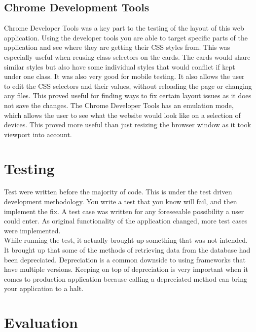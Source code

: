 \subsection{Chrome Development Tools}
Chrome Developer Tools \citep{cdt:2014} was a key part to the testing of the layout of this web application. Using the developer tools you are able to target specific parts of the application and see where they are getting their CSS styles from. This was especially useful when reusing class selectors on the cards. The cards would share similar styles but also have some individual styles that would conflict if kept under one class. It was also very good for mobile testing. It also allows the user to edit the CSS selectors and their values, without reloading the page or changing any files. This proved useful for finding ways to fix certain layout issues as it does not save the changes. The Chrome Developer Tools has an emulation mode, which allows the user to see what the website would look like on a selection of devices. This proved more useful than just resizing the browser window as it took viewport into account. \\

\section{Testing}
Test were written before the majority of code. This is under the test driven development methodology. You write a test that you know will fail, and then implement the fix. A test case was written for any foreseeable possibility a user could enter. As original functionality of the application changed, more test cases were implemented.\\

While running the test, it actually brought up something that was not intended. It brought up that some of the methods of retrieving data from the database had been depreciated. Depreciation is a common downside to using frameworks that have multiple versions. Keeping on top of depreciation is very important when it comes to production application because calling a depreciated method can bring your application to a halt.

\section{Evaluation}
